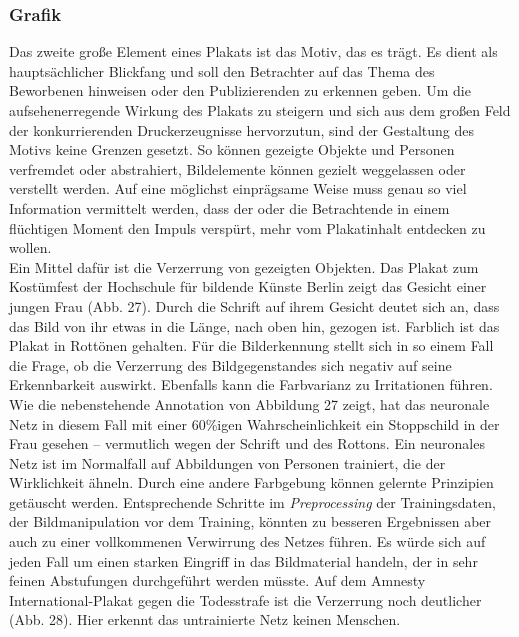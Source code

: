 \documentclass[a4paper,12pt,ngerman]{article}
\begin{document}
\subsubsection{Grafik}
Das zweite große Element eines Plakats ist das Motiv, das es trägt. Es dient als hauptsächlicher Blickfang und soll den Betrachter auf das Thema des Beworbenen hinweisen oder den Publizierenden zu erkennen geben. Um die aufsehenerregende Wirkung des Plakats zu steigern und sich aus dem großen Feld der konkurrierenden Druckerzeugnisse hervorzutun, sind der Gestaltung des Motivs keine Grenzen gesetzt. So können gezeigte Objekte und Personen verfremdet oder abstrahiert, Bildelemente können gezielt weggelassen oder verstellt werden. Auf eine möglichst einprägsame Weise muss genau so viel Information vermittelt werden, dass der oder die Betrachtende in einem flüchtigen Moment den Impuls verspürt, mehr vom Plakatinhalt entdecken zu wollen. \\
Ein Mittel dafür ist die Verzerrung von gezeigten Objekten. Das Plakat zum Kostümfest der Hochschule für bildende Künste Berlin zeigt das Gesicht einer jungen Frau (Abb. 27). Durch die Schrift auf ihrem Gesicht deutet sich an, dass das Bild von ihr etwas in die Länge, nach oben hin, gezogen ist. Farblich ist das Plakat in Rottönen gehalten. Für die Bilderkennung stellt sich in so einem Fall die Frage, ob die Verzerrung des Bildgegenstandes sich negativ auf seine Erkennbarkeit auswirkt. Ebenfalls kann die Farbvarianz zu Irritationen führen. Wie die nebenstehende Annotation von Abbildung 27 zeigt, hat das neuronale Netz in diesem Fall mit einer 60\%igen Wahrscheinlichkeit ein Stoppschild in der Frau gesehen -- vermutlich wegen der Schrift und des Rottons. Ein neuronales Netz ist im Normalfall auf Abbildungen von Personen trainiert, die der Wirklichkeit ähneln. Durch eine andere Farbgebung können gelernte Prinzipien getäuscht werden. Entsprechende Schritte im \textit{Preprocessing} der Trainingsdaten, der Bildmanipulation vor dem Training, könnten zu besseren Ergebnissen aber auch zu einer vollkommenen Verwirrung des Netzes führen. Es würde sich auf jeden Fall um einen starken Eingriff in das Bildmaterial handeln, der in sehr feinen Abstufungen durchgeführt werden müsste. Auf dem Amnesty International-Plakat gegen die Todesstrafe ist die Verzerrung noch deutlicher (Abb. 28). Hier erkennt das untrainierte Netz keinen Menschen. \\
\end{document}
